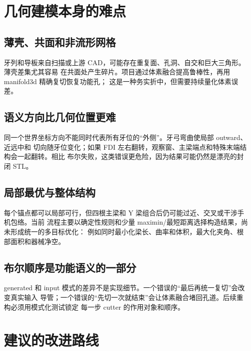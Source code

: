\section{几何建模本身的难点}

\subsection{薄壳、共面和非流形网格}

牙列和导板来自扫描或上游 CAD，可能存在重复面、孔洞、自交和巨大三角形。薄壳差集尤其容易
在共面处产生碎片。项目通过体素融合提高鲁棒性，再用 manifold3d 精确复切恢复功能孔；
这是一种务实折中，但需要持续量化体素误差。

\subsection{语义方向比几何位置更难}

同一个世界坐标方向不能同时代表所有牙位的“外侧”。牙弓弯曲使局部 outward、近远中和
切向随牙位变化；如果 FDI 左右翻转，观察窗、主梁端点和特殊末端结构会一起翻转。相比
布尔失败，这类错误更危险，因为结果可能仍然是漂亮的封闭 STL。

\subsection{局部最优与整体结构}

每个锚点都可以局部可行，但四根主梁和 Y 梁组合后仍可能过近、交叉或干涉手机包络。当前
流程主要以确定性规则和少量 maximin/最短距离选择构造结果，尚未形成统一的多目标优化：
例如同时最小化梁长、曲率和体积，最大化夹角、根部面积和器械净空。

\subsection{布尔顺序是功能语义的一部分}

generated 和 input 模式的差异不是实现细节。一个错误的“最后再统一复切”会改变真实输入
导管；一个错误的“先切一次就结束”会让体素融合堵回孔道。后续重构必须用模式化测试锁定
每一步 cutter 的作用对象和顺序。

\section{建议的改进路线}

